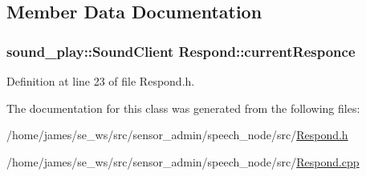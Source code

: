 \subsection{Member Data Documentation}
\hypertarget{class_respond_a890925c8e3426fe340306220a9d89fa8}{
\subsubsection[{current\-Responce}]{\setlength{\rightskip}{0pt plus 5cm}sound\-\_\-play\-::\-Sound\-Client Respond\-::current\-Responce\hspace{0.3cm}{\ttfamily [private]}}}\label{class_respond_a890925c8e3426fe340306220a9d89fa8}


Definition at line 23 of file Respond.\-h.



The documentation for this class was generated from the following files\-:\begin{DoxyCompactItemize}
\item 
/home/james/se\-\_\-ws/src/sensor\-\_\-admin/speech\-\_\-node/src/\hyperlink{_respond_8h}{Respond.\-h}\item 
/home/james/se\-\_\-ws/src/sensor\-\_\-admin/speech\-\_\-node/src/\hyperlink{_respond_8cpp}{Respond.\-cpp}\end{DoxyCompactItemize}
